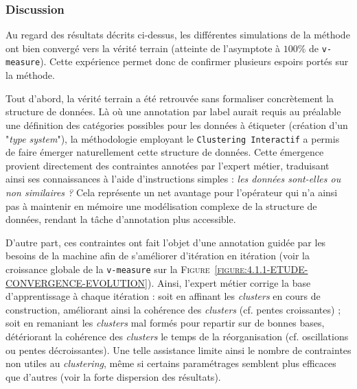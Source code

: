 		\subsubsection{Discussion}
			
			Au regard des résultats décrits ci-dessus, les différentes simulations de la méthode ont bien convergé vers la vérité terrain (atteinte de l'asymptote à $100$\% de \texttt{v-measure}).
			Cette expérience permet donc de confirmer plusieurs espoirs portés sur la méthode.
			
			Tout d'abord, la vérité terrain a été retrouvée sans formaliser concrètement la structure de données.
			Là où une annotation par label aurait requis au préalable une définition des catégories possibles pour les données à étiqueter (création d'un "\textit{type system}"), la méthodologie employant le \texttt{Clustering Interactif} a permis de faire émerger naturellement cette structure de données.
			Cette émergence provient directement des contraintes annotées par l'expert métier, traduisant ainsi ses connaissances à l'aide d'instructions simples : \textit{les données sont-elles ou non similaires ?}
			Cela représente un net avantage pour l'opérateur qui n'a ainsi pas à maintenir en mémoire une modélisation complexe de la structure de données, rendant la tâche d'annotation plus accessible.
			
			D'autre part, ces contraintes ont fait l'objet d'une annotation guidée par les besoins de la machine afin de s'améliorer d'itération en itération (voir la croissance globale de la \texttt{v-measure} sur la \textsc{Figure~\ref{figure:4.1.1-ETUDE-CONVERGENCE-EVOLUTION}}).
			Ainsi, l'expert métier corrige la base d'apprentissage à chaque itération : soit en affinant les \textit{clusters} en cours de construction, améliorant ainsi la cohérence des \textit{clusters} (cf. pentes croissantes) ; soit en remaniant les \textit{clusters} mal formés pour repartir sur de bonnes bases, détériorant la cohérence des \textit{clusters} le temps de la réorganisation (cf. oscillations ou pentes décroissantes).
			Une telle assistance limite ainsi le nombre de contraintes non utiles au \textit{clustering}, même si certains paramétrages semblent plus efficaces que d'autres (voir la forte dispersion des résultats).
			
